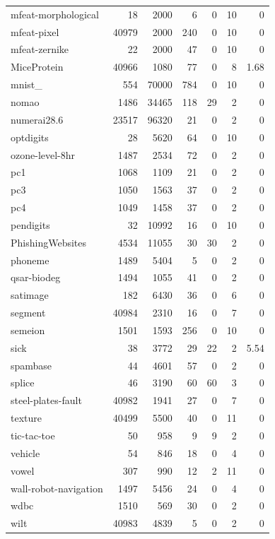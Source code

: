{\begin{longtable}{>{\raggedright\arraybackslash}p{4.6cm}rrrrrr}
mfeat-morphological & 18 & \num{2000} & \num{6} & 0 & 10 & 0 \\
mfeat-pixel & 40979 & \num{2000} & \num{240} & 0 & 10 & 0 \\
mfeat-zernike & 22 & \num{2000} & \num{47} & 0 & 10 & 0 \\
Mice\allowbreak Protein & 40966 & \num{1080} & \num{77} & 0 & 8 & \num{1.68} \\
mnist\_\allowbreak 784 & 554 & \num{70000} & \num{784} & 0 & 10 & 0 \\
nomao & 1486 & \num{34465} & \num{118} & 29 & 2 & 0 \\
numerai28.6 & 23517 & \num{96320} & \num{21} & 0 & 2 & 0 \\
optdigits & 28 & \num{5620} & \num{64} & 0 & 10 & 0 \\
ozone-level-8hr & 1487 & \num{2534} & \num{72} & 0 & 2 & 0 \\
pc1 & 1068 & \num{1109} & \num{21} & 0 & 2 & 0 \\
pc3 & 1050 & \num{1563} & \num{37} & 0 & 2 & 0 \\
pc4 & 1049 & \num{1458} & \num{37} & 0 & 2 & 0 \\
pendigits & 32 & \num{10992} & \num{16} & 0 & 10 & 0 \\
Phishing\allowbreak Websites & 4534 & \num{11055} & \num{30} & 30 & 2 & 0 \\
phoneme & 1489 & \num{5404} & \num{5} & 0 & 2 & 0 \\
qsar-biodeg & 1494 & \num{1055} & \num{41} & 0 & 2 & 0 \\
satimage & 182 & \num{6430} & \num{36} & 0 & 6 & 0 \\
segment & 40984 & \num{2310} & \num{16} & 0 & 7 & 0 \\
semeion & 1501 & \num{1593} & \num{256} & 0 & 10 & 0 \\
sick & 38 & \num{3772} & \num{29} & 22 & 2 & \num{5.54} \\
spambase & 44 & \num{4601} & \num{57} & 0 & 2 & 0 \\
splice & 46 & \num{3190} & \num{60} & 60 & 3 & 0 \\
steel-plates-fault & 40982 & \num{1941} & \num{27} & 0 & 7 & 0 \\
texture & 40499 & \num{5500} & \num{40} & 0 & 11 & 0 \\
tic-tac-toe & 50 & \num{958} & \num{9} & 9 & 2 & 0 \\
vehicle & 54 & \num{846} & \num{18} & 0 & 4 & 0 \\
vowel & 307 & \num{990} & \num{12} & 2 & 11 & 0 \\
wall-robot-navigation & 1497 & \num{5456} & \num{24} & 0 & 4 & 0 \\
wdbc & 1510 & \num{569} & \num{30} & 0 & 2 & 0 \\
wilt & 40983 & \num{4839} & \num{5} & 0 & 2 & 0 \\
\end{longtable}
}
